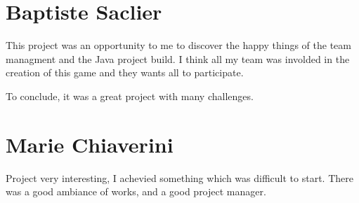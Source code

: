 \documentclass{report}
\begin{document}
\section{Baptiste Saclier}

This project was an opportunity to me to discover the happy things of the team managment and the Java project build. I think all my team was involded in the creation of this game and they wants all to participate.

To conclude, it was a great project with many challenges.

\section{Marie Chiaverini}

Project very interesting, I achevied something which was difficult to start. There was a good ambiance of works,  and a good project manager.
\end{document}
